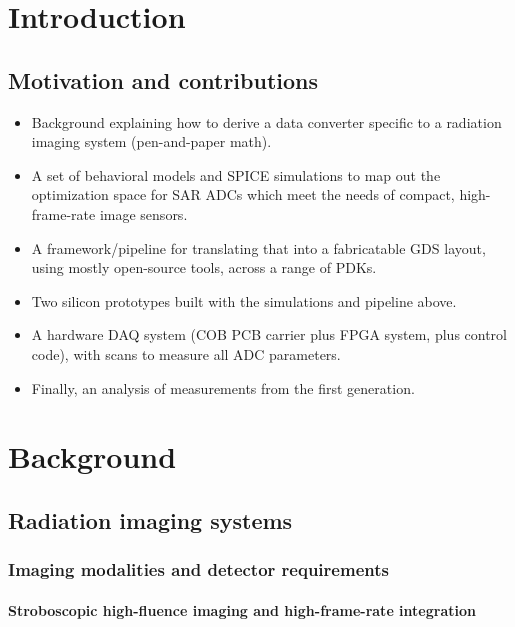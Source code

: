\documentclass[PhD, UKenglish]{scrbook}
\begin{document}
\raggedbottom

\frontmatter
\pagestyle{scrplain}

\tableofcontents

\mainmatter
\pagestyle{scrheadings}

\chapter{Introduction}
\section{Motivation and contributions}

\begin{itemize}
  \item Background explaining how to derive a data converter specific to a radiation imaging system (pen-and-paper math).
  \item A set of behavioral models and SPICE simulations to map out the optimization space for SAR ADCs which meet the needs of compact, high-frame-rate image sensors.
  \item A framework/pipeline for translating that into a fabricatable GDS layout, using mostly open-source tools, across a range of PDKs.
  \item Two silicon prototypes built with the simulations and pipeline above.
  \item A hardware DAQ system (COB PCB carrier plus FPGA system, plus control code), with scans to measure all ADC parameters.
  \item Finally, an analysis of measurements from the first generation.
\end{itemize}

\chapter{Background}

\section{Radiation imaging systems}
\subsection{Imaging modalities and detector requirements}
\subsubsection{Stroboscopic high-fluence imaging and high-frame-rate integration}
\end{document}
